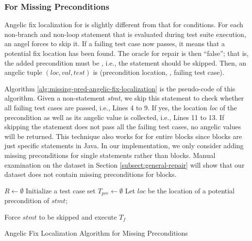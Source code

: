 \subsubsection{For Missing Preconditions}
\label{subsubsect:precondition}

Angelic fix localization for \preconditions is slightly different from that for \ourif conditions.
For each non-branch and non-loop statement that is evaluated during test suite execution, an angel forces to skip it. 
If a failing test case now passes, it means that a potential fix location has been found. 
The oracle for repair is then  ``false''; that is, the added precondition must be \myfalse, i.e., the statement should be skipped. Then, an angelic tuple $(loc, val, test)$ is (precondition location, , failing test case). 

Algorithm \ref{alg:missing-pred-angelic-fix-localization} is the pseudo-code of this algorithm. Given a non-\ourif statement \textit{stmt}, we skip this statement to check whether all failing test cases are passed, i.e., Lines 4 to 9. If yes, the location \textit{loc} of the precondition as well as its angelic value  is collected, i.e., Lines 11 to 13. 
If skipping the statement does not pass all the failing test cases, no angelic values will be returned. 
This technique also works for \preconditions for entire blocks since blocks are just specific statements in Java. In our implementation, we only consider adding missing preconditions for single statements rather than blocks. Manual examination on the dataset in Section \ref{subsect:general-repair} will show that our dataset does not contain missing preconditions for blocks. 

\begin{algorithm}[!t]


\BlankLine  
$R \leftarrow \emptyset$\;
Initialize a test case set $T_{pre} \leftarrow \emptyset$\; 
Let $loc$ be the location of a potential precondition of $stmt$;

\BlankLine
Force $stmt$ to be skipped and execute $T_f$\; 

\BlankLine
{}
\BlankLine
\caption{Angelic Fix Localization Algorithm for Missing Preconditions}
\label{alg:missing-pred-angelic-fix-localization}
\end{algorithm}

